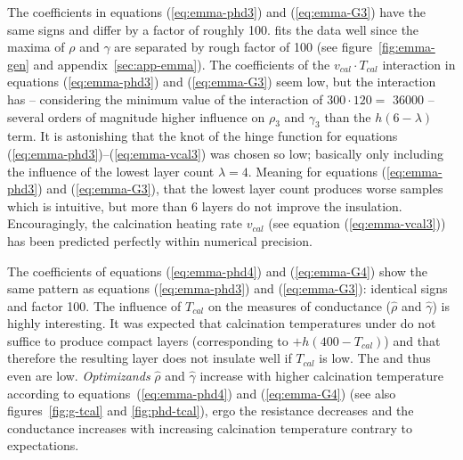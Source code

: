 The coefficients in equations (\ref{eq:emma-phd3}) and (\ref{eq:emma-G3}) have the same signs and differ by a factor of roughly 100.
 fits the data well since the maxima of $\rho$ and $\gamma$ are separated by rough factor of 100 (see figure~\ref{fig:emma-gen} and appendix~\ref{sec:app-emma}). %
The coefficients of the $v_{cal} \cdot T_{cal}$ interaction in equations (\ref{eq:emma-phd3}) and (\ref{eq:emma-G3}) 
seem low, but the interaction has -- considering the minimum value of the interaction of $300 \cdot 120 =$  \num{36000} -- several orders of magnitude higher influence on $\rho_3$ and $\gamma_3$ than the $h(6-\lambda)$ term. 
It is astonishing that the knot of the hinge function for equations (\ref{eq:emma-phd3})--(\ref{eq:emma-vcal3}) was chosen so low; 
basically only including the influence of the lowest layer count $\lambda=4$.
Meaning for equations (\ref{eq:emma-phd3}) and (\ref{eq:emma-G3}), that the lowest layer count produces worse samples which is intuitive, but more than 6 layers do not improve the insulation. 
Encouragingly, the calcination heating rate $v_{cal}$ (see equation (\ref{eq:emma-vcal3})) has been predicted perfectly within numerical precision. 

The coefficients of equations (\ref{eq:emma-phd4}) and (\ref{eq:emma-G4}) show the same pattern 
as equations (\ref{eq:emma-phd3}) and (\ref{eq:emma-G3}): identical signs and factor 100. 
%
The influence of $T_{cal}$ on the measures of conductance ($\hat\rho$ and $\hat\gamma$) is highly interesting. 
It was expected that 
calcination temperatures under  do not suffice to produce compact layers (corresponding to $+h(400-T_{cal})$)
and 
that therefore the resulting layer does not insulate well if $T_{cal}$ is low. 
The  and thus even  are low.
\textit{Optimizands} $\hat\rho$ and $\hat{\gamma}$ increase with higher calcination temperature 
according to equations~(\ref{eq:emma-phd4}) and (\ref{eq:emma-G4}) (see also figures~\ref{fig:g-tcal} and \ref{fig:phd-tcal}), 
ergo the resistance decreases and the conductance increases with increasing calcination temperature contrary to expectations.

